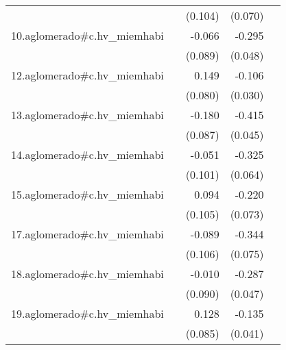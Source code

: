 {\begin{longtable}{l*{4}{D{.}{.}{-1}}}
            &                     &     (0.104)         &     (0.070)         &                     \\
\addlinespace
10.aglomerado#c.hv\_miemhabi&                     &      -0.066         &      -0.295\sym{***}&                     \\
            &                     &     (0.089)         &     (0.048)         &                     \\
\addlinespace
12.aglomerado#c.hv\_miemhabi&                     &       0.149         &      -0.106\sym{***}&                     \\
            &                     &     (0.080)         &     (0.030)         &                     \\
\addlinespace
13.aglomerado#c.hv\_miemhabi&                     &      -0.180\sym{*}  &      -0.415\sym{***}&                     \\
            &                     &     (0.087)         &     (0.045)         &                     \\
\addlinespace
14.aglomerado#c.hv\_miemhabi&                     &      -0.051         &      -0.325\sym{***}&                     \\
            &                     &     (0.101)         &     (0.064)         &                     \\
\addlinespace
15.aglomerado#c.hv\_miemhabi&                     &       0.094         &      -0.220\sym{**} &                     \\
            &                     &     (0.105)         &     (0.073)         &                     \\
\addlinespace
17.aglomerado#c.hv\_miemhabi&                     &      -0.089         &      -0.344\sym{***}&                     \\
            &                     &     (0.106)         &     (0.075)         &                     \\
\addlinespace
18.aglomerado#c.hv\_miemhabi&                     &      -0.010         &      -0.287\sym{***}&                     \\
            &                     &     (0.090)         &     (0.047)         &                     \\
\addlinespace
19.aglomerado#c.hv\_miemhabi&                     &       0.128         &      -0.135\sym{***}&                     \\
            &                     &     (0.085)         &     (0.041)         &                     \\

\end{longtable}}
